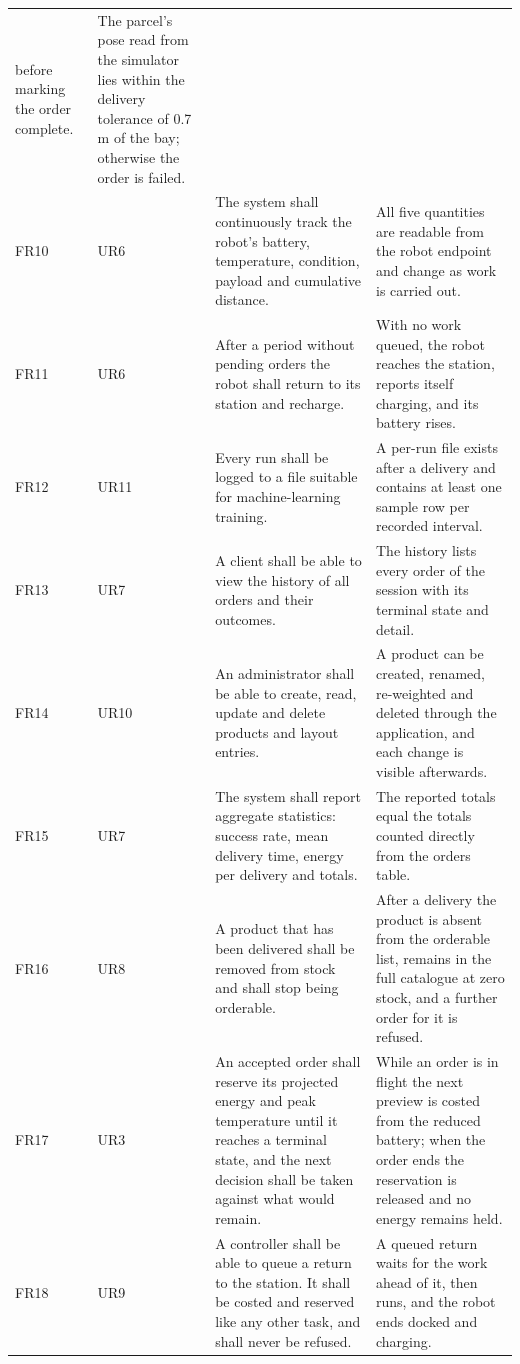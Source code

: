 \documentclass[12pt,a4paper]{report}
\begin{document}
\begin{longtable}{@{}p{}p{}p{}p{}@{}}
before marking the order complete. & The parcel's pose read from the simulator lies within the
delivery tolerance of 0.7 m of the bay; otherwise the order is failed. \\
FR10 & UR6 & The system shall continuously track the robot's battery, temperature, condition,
payload and cumulative distance. & All five quantities are readable from the robot endpoint and
change as work is carried out. \\
FR11 & UR6 & After a period without pending orders the robot shall return to its station and
recharge. & With no work queued, the robot reaches the station, reports itself charging, and its
battery rises. \\
FR12 & UR11 & Every run shall be logged to a file suitable for machine-learning training. & A
per-run file exists after a delivery and contains at least one sample row per recorded interval. \\
FR13 & UR7 & A client shall be able to view the history of all orders and their outcomes. & The
history lists every order of the session with its terminal state and detail. \\
FR14 & UR10 & An administrator shall be able to create, read, update and delete products and layout
entries. & A product can be created, renamed, re-weighted and deleted through the application, and
each change is visible afterwards. \\
FR15 & UR7 & The system shall report aggregate statistics: success rate, mean delivery time, energy
per delivery and totals. & The reported totals equal the totals counted directly from the orders
table. \\
FR16 & UR8 & A product that has been delivered shall be removed from stock and shall stop being
orderable. & After a delivery the product is absent from the orderable list, remains in the full
catalogue at zero stock, and a further order for it is refused. \\
FR17 & UR3 & An accepted order shall reserve its projected energy and peak temperature until it
reaches a terminal state, and the next decision shall be taken against what would remain. & While
an order is in flight the next preview is costed from the reduced battery; when the order ends the
reservation is released and no energy remains held. \\
FR18 & UR9 & A controller shall be able to queue a return to the station. It shall be costed and
reserved like any other task, and shall never be refused. & A queued return waits for the work
ahead of it, then runs, and the robot ends docked and charging. \\

\end{longtable}
\end{document}
